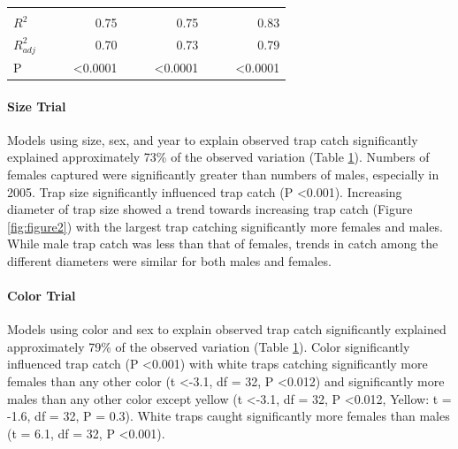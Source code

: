 \documentclass[alpha-refs]{wiley-article}
\begin{document}
\begin{table}[]
\begin{tabular}{lrrrrrrrrr}
              &                       &                        &                       &                       &                        &                       &                       &                        &                       \\
$R^2$            &                       &                        & 0.75                  &                       &                        & 0.75                  &                       &                        & 0.83                  \\
$R^2_{adj}$         &                       &                        & 0.70                  &                       &                        & 0.73                  &                       &                        & 0.79                  \\
P             &                       &                        & \textless 0.0001      &                       &                        & \textless 0.0001      &                       &                        & \textless 0.0001     
\end{tabular}
\label{table:1}
\end{table}



\paragraph{Size Trial} Models using size, sex, and year to explain observed trap catch significantly explained approximately 73\% of the observed variation (Table \ref{table:1}).  Numbers of females captured were significantly greater than numbers of males, especially in 2005. Trap size significantly influenced trap catch (P \textless 0.001).  Increasing diameter of trap size showed a trend towards increasing trap catch (Figure \ref{fig:figure2}) with the largest trap catching significantly more females and males.  While male trap catch was less than that of females, trends in catch among the different diameters were similar for both males and females.  


\paragraph{Color Trial} Models using color and sex to explain observed trap catch significantly explained approximately 79\% of the observed variation (Table \ref{table:1}). Color significantly influenced trap catch (P \textless 0.001) with white traps catching significantly more females than any other color (t \textless -3.1, df = 32, P \textless 0.012) and significantly more males than any other color except yellow (t \textless -3.1, df = 32, P \textless 0.012, Yellow: t = -1.6, df = 32, P = 0.3).  White traps caught significantly more females than males (t = 6.1, df = 32, P \textless 0.001).
\end{document}
